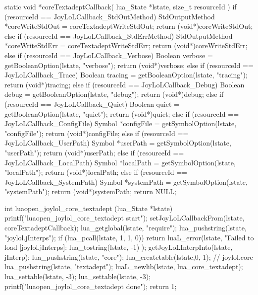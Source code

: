 static void *coreTextadeptCallback(
  lua_State *lstate,
  size_t resourceId
) {
  if (resourceId == JoyLoLCallback_StdOutMethod) {
    StdOutputMethod *coreWriteStdOut =
      coreTextadeptWriteStdOut;
    return (void*)coreWriteStdOut;
  } else if (resourceId == JoyLoLCallback_StdErrMethod) {
    StdOutputMethod *coreWriteStdErr =
      coreTextadeptWriteStdErr;
    return (void*)coreWriteStdErr;
  } else if (resourceId == JoyLoLCallback_Verbose) {
    Boolean verbose = getBooleanOption(lstate, "verbose");
    return (void*)verbose;
  } else if (resourceId == JoyLoLCallback_Trace) {
    Boolean tracing = getBooleanOption(lstate, "tracing");
    return (void*)tracing;
  } else if (resourceId == JoyLoLCallback_Debug) {
    Boolean debug = getBooleanOption(lstate, "debug");
    return (void*)debug;
  } else if (resourceId == JoyLoLCallback_Quiet) {
    Boolean quiet = getBooleanOption(lstate, "quiet");
    return (void*)quiet;
  } else if (resourceId == JoyLoLCallback_ConfigFile) {
    Symbol *configFile = getSymbolOption(lstate, "configFile");
    return (void*)configFile;
  } else if (resourceId == JoyLoLCallback_UserPath) {
    Symbol *userPath = getSymbolOption(lstate, "userPath");
    return (void*)userPath;
  } else if (resourceId == JoyLoLCallback_LocalPath) {
    Symbol *localPath = getSymbolOption(lstate, "localPath");
    return (void*)localPath;
  } else if (resourceId == JoyLoLCallback_SystemPath) {
    Symbol *systemPath = getSymbolOption(lstate, "systemPath");
    return (void*)systemPath;
  }
  return NULL;
} 

int luaopen_joylol_core_textadept (lua_State *lstate) {
  printf("luaopen_joylol_core_textadept start\n");
  setJoyLoLCallbackFrom(lstate, coreTextadeptCallback);
  lua_getglobal(lstate, "require");
  lua_pushstring(lstate, "joylol.jInterps");
  if (lua_pcall(lstate, 1, 1, 0)) {
    return luaL_error(lstate,
      "Failed to load [joylol.jInterps]\nERROR:\n%
      lua_tostring(lstate, -1)
    );
  }
  getJoyLoLInterpInto(lstate, jInterp);
  lua_pushstring(lstate, "core");
  lua_createtable(lstate,0, 1); // joylol.core 
  lua_pushstring(lstate, "textadept");
  luaL_newlib(lstate, lua_core_textadept);
  lua_settable(lstate, -3);
  lua_settable(lstate, -3);
  printf("luaopen_joylol_core_textadept done\n");
  return 1;
}
\stopCCode